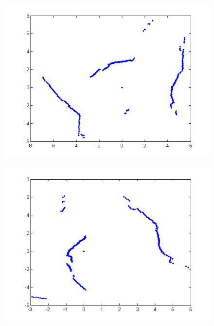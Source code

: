 {		\begin{figure}[position = here]
			\begin{centering}
				\includegraphics[scale=1]{./images/q2/wall_3_attempt2.png}\\
				\caption[\textit{RPYAxes}]{}
			\end{centering}
		\end{figure}
		\newline
		\pagebreak

		\begin{figure}[position = here]
			\begin{centering}
				\includegraphics[scale=1]{./images/q2/wall_5_attempt2.png}\\
				\caption[\textit{RPYAxes}]{}
			\end{centering}
		\end{figure}
		\newline
		\pagebreak
				
}
